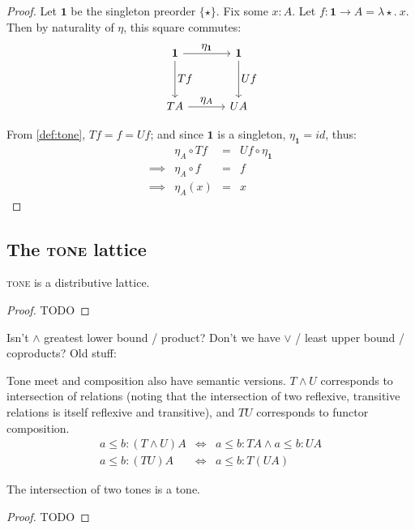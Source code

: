 \documentclass{rntz}
\newcommand{\todo}[1]{{\color{Purple}#1}}
\newcommand{\mb}[1]{\ensuremath{\mathbf{#1}}}
\newcommand{\mi}[1]{\ensuremath{\mathit{#1}}}
\newcommand{\fn}{\lambda}
\newcommand{\binder}{.~}
\newcommand{\bind}[1]{{#1}\binder}
\newcommand{\fnof}[1]{\fn\bind{#1}}
\newcommand{\cat}[1]{\textsc{#1}} %
\newcommand{\Tone}{\cat{tone}}
\newcommand\idfn{\mi{id}}
\newcommand\tmeet{\wedge}                  %
\begin{document}
\begin{proof}
  Let $\mb{1}$ be the singleton preorder $\{\star\}$. Fix some $x : A$. Let $f :
  \mb{1} \to A = \fnof{\star}{x}$. Then by naturality of $\eta$, this square
  commutes:
  \[\tikzset{
    no line/.style={draw=none,
      commutative diagrams/every label/.append style={/tikz/auto=false}}}
  \begin{tikzcd}[sep=3.3em]
    \mb{1} \arrow[r,"\textstyle \eta_{\mb{1}}"] \arrow[d,"\textstyle Tf"]
    & \mb{1} \arrow[d,"\textstyle Uf"]
    \\ TA \arrow[r,"\textstyle\eta_A"]
    & UA
  \end{tikzcd}\]

From \cref{def:tone}, $Tf = f = Uf$; and since $\mb{1}$ is
a singleton, $\eta_{\mb{1}} = \idfn$, thus:
  \[\begin{array}{rlcl}
  & \eta_A \circ Tf &=& Uf \circ \eta_{\mb{1}}\\
  \implies & \eta_A \circ f &=& f\\
  \implies & \eta_A(x) &=& x
  \end{array}\]
\end{proof}


\subsection{The \Tone{} lattice}

\begin{conjecture}
  \Tone{} is a distributive lattice.
\end{conjecture}
\begin{proof}
  \todo{TODO}
\end{proof}

\todo{Isn't $\tmeet$ greatest lower bound / product? Don't we have
  $\vee$ / least upper bound / coproducts? Old stuff:}

Tone meet and composition also have semantic versions. $T \tmeet U$ corresponds
to intersection of relations (noting that the intersection of two reflexive,
transitive relations is itself reflexive and transitive), and $TU$ corresponds
to functor composition.
%
\begin{eqnarray*}
  a \le b : (T \tmeet U)A %
  &\iff& a \le b : TA \wedge a \le b : UA\\
  a \le b : (TU)A &\iff& a \le b : T(UA)
\end{eqnarray*}

\begin{conjecture}
  The intersection of two tones is a tone.
\end{conjecture}
\begin{proof}
  \todo{TODO}
\end{proof}
\end{document}
